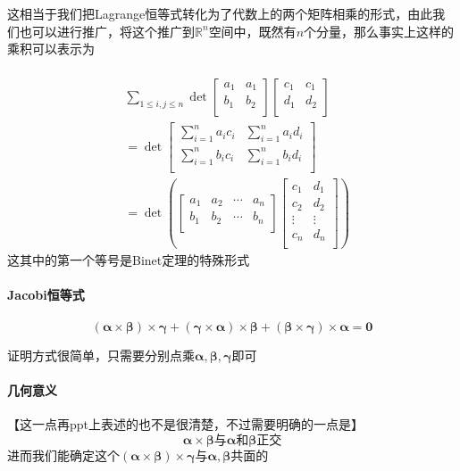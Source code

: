 \documentclass{article}
\newcommand{\ve}{\boldsymbol}
\begin{document}
\begin{CJK}{UTF8}{gkai}
这相当于我们把Lagrange恒等式转化为了代数上的两个矩阵相乘的形式，由此我们也可以进行推广，将这个推广到$\mathbb{R}^n$空间中，既然有$n$个分量，那么事实上这样的乘积可以表示为

\[
\begin{aligned}    
&\quad\\
&\sum_{1\leq i,j\leq n}\det\begin{bmatrix}
    a_1&a_1\\
    b_1&b_2\\
\end{bmatrix}
\begin{bmatrix}
    c_1&c_1\\
    d_1&d_2\\
\end{bmatrix}\\
&=\det
\begin{bmatrix}
    \sum_{i=1}^n a_i c_i&\sum_{i=1}^n a_i d_i\\
    \sum_{i=1}^n b_i c_i&\sum_{i=1}^n b_i d_i\\
\end{bmatrix}\\
&=\det\left(
    \begin{bmatrix}
        a_1&a_2&\cdots&a_n\\
        b_1&b_2&\cdots&b_n\\
    \end{bmatrix}
    \begin{bmatrix}
        c_1&d_1\\
        c_2&d_2\\
        \vdots&\vdots\\
        c_n&d_n\\
    \end{bmatrix}
\right)
\end{aligned}\]
这其中的第一个等号是Binet定理的特殊形式\\

\paragraph{Jacobi恒等式\\}
\[(\ve{\alpha}\times\ve{\beta})\times\ve{\gamma}+(\ve{\gamma}\times\ve{\alpha})\times\ve{\beta}+(\ve{\beta}\times\ve{\gamma})\times\ve{\alpha}=\ve{0}\]

证明方式很简单，只需要分别点乘$\ve{\alpha},\ve{\beta},\ve{\gamma}$即可
\paragraph{几何意义\\}
【这一点再ppt上表述的也不是很清楚，不过需要明确的一点是】\\
\[\ve{\alpha}\times\ve{\beta}\text{与}\ve{\alpha}\textbf{和}\ve{\beta}\text{正交}\]
进而我们能确定这个$(\ve{\alpha}\times\ve{\beta})\times \ve{\gamma}$与$\ve{\alpha},\ve{\beta}$共面的\\


\end{CJK}
\end{document}
